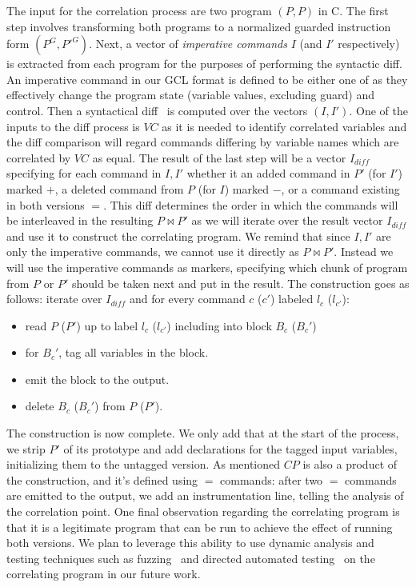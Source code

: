 The input for the correlation process are two program $(P,P)$ in C. The first step involves transforming both programs to a normalized guarded instruction form $(P^{G},P'^{G})$. Next, a vector of \emph{imperative commands} $I$ (and $I'$ respectively) is extracted from each program for the purposes of performing the syntactic diff. An imperative command in our GCL format is defined to be either one of  as they effectively change the program state (variable values, excluding guard) and control. Then a syntactical diff~\cite{HuntMcIlroy75} is computed over the vectors $(I,I')$. One of the inputs to the diff process is $VC$ as it is needed to identify correlated variables and the diff comparison will regard commands differing by variable names which are correlated by $VC$ as equal. The result of the last step will be a vector $I_{diff}$ specifying for each command in $I,I'$ whether it an added command in $P'$ (for $I'$) marked $+$, a deleted command from $P$ (for $I$) marked $-$, or a command existing in both versions $=$. This diff determines the order in which the commands will be interleaved in the resulting $P \bowtie P'$ as we will iterate over the result vector $I_{diff}$ and use it to construct the correlating program. We remind that since $I,I'$ are only the imperative commands, we cannot use it directly as $P \bowtie P'$. Instead we will use the imperative commands as markers, specifying which chunk of program from $P$ or $P'$ should be taken next and put in the result. The construction goes as follows: iterate over $I_{diff}$ and for every command $c$ ($c'$) labeled $l_c$ ($l_{c'}$):
\begin{itemize}
\item read $P$ ($P'$) up to label $l_c$ ($l_{c'}$) including into block $B_c$ ($B_c'$)
\item for $B_c'$, tag all variables in the block.
\item emit the block to the output.
\item delete $B_c$ ($B_c'$) from $P$ ($P'$).
\end{itemize}
The construction is now complete. We only add that at the start of the process, we strip $P'$ of its prototype and add declarations for the tagged input variables, initializing them to the untagged version.
As mentioned $CP$ is also a product of the construction, and it's defined using $=$ commands: after two $=$ commands are emitted to the output, we add an instrumentation line, telling the analysis of the correlation point.
One final observation regarding the correlating program is that it is a legitimate program that can be run to achieve the effect of running both versions. We plan to leverage this ability to use dynamic analysis and testing techniques such as fuzzing~\cite{NethercoteSeward07} and directed automated testing~\cite{CadarDunbarEngler08} on the correlating program in our future work.
